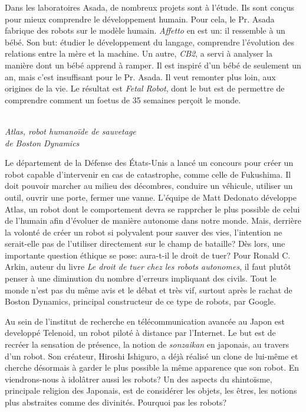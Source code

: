 \documentclass[9pt,final,hyphenatedtitles]{papertex}
\begin{document}
\begin{news}{3}
Dans les laboratoires Asada, de nombreux projets sont à l'étude. Ils sont conçus pour mieux comprendre le développement humain. Pour cela, le Pr. Asada fabrique des robots sur le modèle humain. \textit{Affetto} en est un: il ressemble à un bébé. Son but: étudier le développement du langage, comprendre l'évolution des relations entre la mère et la machine. Un autre, \textit{CB2}, a servi à analyser la manière dont un bébé apprend à ramper. Il est inspiré d'un bébé de seulement un an, mais c'est insuffisant pour le Pr. Asada. Il veut remonter plus loin, aux origines de la vie. Le résultat est \textit{Fetal Robot}, dont le but est de permettre de comprendre comment un foetus de 35 semaines perçoit le monde.

\vspace*{2.5mm}
\vspace*{1mm}\\
\textit{\hspace*{3.5mm}Atlas, robot humanoïde de sauvetage \\\hspace*{1.5cm}de Boston Dynamics}

Le département de la Défense des États-Unis a lancé un concours pour créer un robot capable d'intervenir en cas de catastrophe, comme celle de Fukushima. Il doit pouvoir marcher au milieu des décombres, conduire un véhicule, utiliser un outil, ouvrir une porte, fermer une vanne. L'équipe de Matt Dedonato développe Atlas, un robot dont le comportement devra se rapprcher le plus possible de celui de l'humain afin d'évoluer de manière autonome dans notre monde. Mais, derrière la volonté de créer un robot si polyvalent pour sauver des vies, l'intention ne serait-elle pas de l'utiliser directement sur le champ de bataille? Dès lors, une importante question éthique se pose: aura-t-il le droit de tuer? Pour Ronald C. Arkin, auteur du livre \textit{Le droit de tuer chez les robots autonomes}, il faut plutôt penser à une diminution du nombre d'erreurs impliquant des civils. Tout le monde n'est pas du même avis et le débat et très vif, surtout après le rachat de Boston Dynamics, principal constructeur de ce type de robots, par Google.





Au sein de l'institut de recherche en télécommunication avancée au Japon est developpé Telenoid, un robot piloté à distance par l'Internet. Le but est de recréer la sensation de présence, la notion de \textit{sonzaikan} en japonais, au travers d'un robot. Son créateur, Hiroshi Ishiguro, a déjà réalisé un clone de lui-même et cherche désormais à garder le plus possible la même apparence que son robot. En viendrons-nous à idolâtrer aussi les robots? Un des aspects du shintoïsme, principale religion des Japonais, est de considérer les objets, les êtres, les notions plus abstraites comme des divinités. Pourquoi pas les robots?


\end{news}
\end{document}
